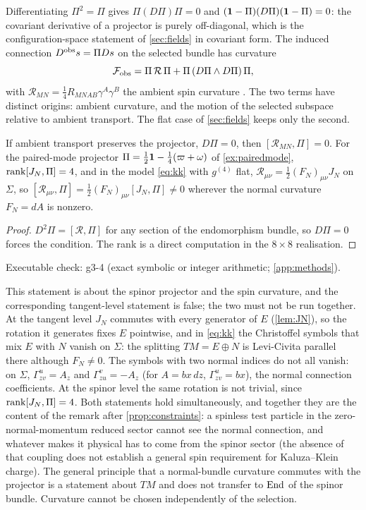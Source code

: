 Differentiating $\Pi^2=\Pi$ gives $\Pi(D\Pi)\Pi=0$ and $(\mathbf 1-\Pi)(D\Pi)(\mathbf 1-\Pi)=0$: the covariant derivative of a projector is purely off-diagonal, which is the
configuration-space statement of \cref{sec:fields} in covariant form. The induced connection $D^{\rm obs}s=\Pi Ds$ on the selected bundle has curvature
\begin{equation}
\label{eq:Fobs}
\mathcal F_{\rm obs}=\Pi\,\mathcal R\,\Pi+\Pi\,(D\Pi\wedge D\Pi)\,\Pi ,
\end{equation}
with $\mathcal R_{MN}=\tfrac14R_{MNAB}\gamma^A\gamma^B$ the ambient spin curvature \cite{LawsonMichelsohn}. The two terms have distinct origins: ambient curvature, and the
motion of the selected subspace relative to ambient transport. The flat case of \cref{sec:fields} keeps only the second.

\begin{proposition}
\label{prop:obstruct}
If ambient transport preserves the projector, $D\Pi=0$, then $[\mathcal R_{MN},\Pi]=0$. For the paired-mode projector $\Pi=\tfrac12\mathbf 1-\tfrac14(\varpi+\omega)$ of
\cref{ex:pairedmode}, $\operatorname{rank}[J_N,\Pi]=4$, and in the model \eqref{eq:kk} with $g^{(4)}$ flat, $\mathcal R_{\mu\nu}=\tfrac12(F_N)_{\mu\nu}J_N$ on $\Sigma$, so
$[\mathcal R_{\mu\nu},\Pi]=\tfrac12(F_N)_{\mu\nu}[J_N,\Pi]\neq0$ wherever the normal curvature $F_N=dA$ is nonzero.
\end{proposition}

\begin{proof}
$D^2\Pi=[\mathcal R,\Pi]$ for any section of the endomorphism bundle, so $D\Pi=0$ forces the condition. The rank is a direct computation in the $8\times8$ realisation.
\end{proof}

\noindent Executable check: g3-4 (exact symbolic or integer arithmetic; \cref{app:methods}).

This statement is about the spinor projector and the spin curvature, and the corresponding tangent-level statement is false; the two must not be run together.
At the tangent level $J_N$ commutes with every generator of $E$ (\cref{lem:JN}), so the rotation it generates fixes $E$ pointwise, and in \eqref{eq:kk} the
Christoffel symbols that mix $E$ with $N$ vanish on $\Sigma$: the splitting $TM=E\oplus N$ is Levi-Civita parallel there although $F_N\neq0$. The symbols with two
normal indices do not all vanish: on $\Sigma$, $\Gamma^u_{zv}=A_z$ and $\Gamma^v_{zu}=-A_z$ (for $A=bx\,dz$, $\Gamma^u_{zv}=bx$), the normal connection coefficients. At the spinor level the same rotation is
not trivial, since $\operatorname{rank}[J_N,\Pi]=4$. Both statements hold simultaneously, and together they are the content of the remark after \cref{prop:constraints}: a
spinless test particle in the zero-normal-momentum reduced sector cannot see the normal connection, and whatever makes it physical has to
come from the spinor sector (the absence of that coupling does not establish a general spin requirement for Kaluza--Klein charge). The general principle that a
normal-bundle curvature commutes with the projector is a statement about $TM$ and does not transfer to $\operatorname{End}$ of the spinor bundle. Curvature cannot be chosen
independently of the selection.

